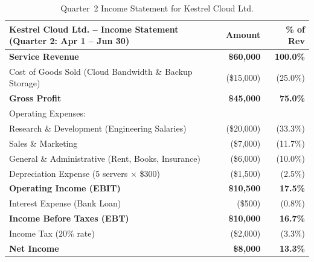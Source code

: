 \begin{table}[htbp]
\centering
\small
\begin{tabular}{@{}lrr@{}}
\toprule
\textbf{Kestrel Cloud Ltd. -- Income Statement (Quarter 2: Apr 1 -- Jun 30)} & \textbf{Amount} & \textbf{\% of Rev} \\
\midrule
\textbf{Service Revenue}                               & \textbf{\$60,000} & \textbf{100.0\%} \\
Cost of Goods Sold (Cloud Bandwidth \& Backup Storage) & (\$15,000)        & (25.0\%) \\
\midrule
\textbf{Gross Profit}                                  & \textbf{\$45,000} & \textbf{75.0\%} \\
Operating Expenses:                                    &                   &          \\
\quad Research \& Development (Engineering Salaries)   & (\$20,000)        & (33.3\%) \\
\quad Sales \& Marketing                               & (\$7,000)         & (11.7\%) \\
\quad General \& Administrative (Rent, Books, Insurance) & (\$6,000)       & (10.0\%) \\
\quad Depreciation Expense (5 servers $\times$ \$300)  & (\$1,500)         & (2.5\%)  \\
\midrule
\textbf{Operating Income (EBIT)}                       & \textbf{\$10,500} & \textbf{17.5\%} \\
Interest Expense (Bank Loan)                           & (\$500)           & (0.8\%)  \\
\midrule
\textbf{Income Before Taxes (EBT)}                     & \textbf{\$10,000} & \textbf{16.7\%} \\
Income Tax ($20\%$ rate)                               & (\$2,000)         & (3.3\%)  \\
\midrule
\textbf{Net Income}                                    & \textbf{\$8,000}  & \textbf{13.3\%} \\
\bottomrule
\end{tabular}
\caption{Quarter~2 Income Statement for Kestrel Cloud Ltd.}
\label{tab:ch02-income-statement}
\end{table}

